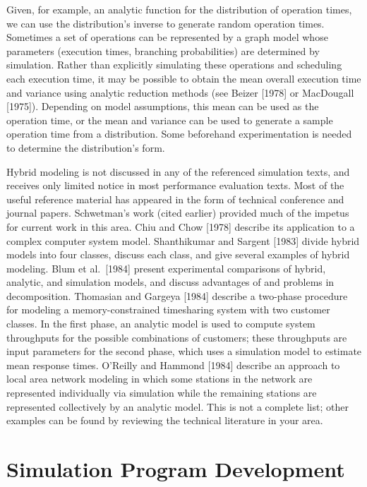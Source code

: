 Given, for example, an analytic function for the distribution of operation
times, we can use the distribution's inverse to generate random operation
times. Sometimes a set of operations can be represented by a graph model whose
parameters (execution times, branching probabilities) are determined by
simulation. Rather than explicitly simulating these operations and scheduling
each execution time, it may be possible to obtain the mean overall execution
time and variance using analytic reduction methods (see Beizer [1978] or
MacDougall [1975]). Depending on model assumptions, this mean can be used as
the operation time, or the mean and variance can be used to generate a sample
operation time from a distribution. Some beforehand experimentation is needed
to determine the distribution's form.

Hybrid modeling is not discussed in any of the referenced simulation texts,
and receives only limited notice in most performance evaluation texts. Most of
the useful reference material has appeared in the form of technical conference
and journal papers. Schwetman's work (cited earlier) provided much of the
impetus for current work in this area. Chiu and Chow [1978] describe its
application to a complex computer system model. Shanthikumar and Sargent
[1983] divide hybrid models into four classes, discuss each class, and give
several examples of hybrid modeling. Blum et al.\ [1984] present experimental
comparisons of hybrid, analytic, and simulation models, and discuss advantages
of and problems in decomposition. Thomasian and Gargeya [1984] describe a
two-phase procedure for modeling a memory-constrained timesharing system with
 two customer classes. In the first phase, an analytic model is used to compute
system throughputs for the possible combinations of customers; these
throughputs are input parameters for the second phase, which uses a
simulation model to estimate mean response times. O'Reilly and Hammond
[1984] describe an approach to local area network modeling in which some
stations in the network are represented individually via simulation while the
remaining stations are represented collectively by an analytic model. This is
not a complete list; other examples can be found by reviewing the technical
literature in your area.

\section{Simulation Program Development}
\label{sec:simulation-program-development}

